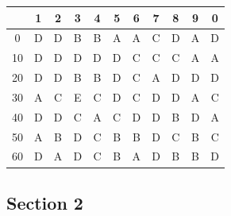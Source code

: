 \documentclass[11pt,a4paper]{article}
\begin{document}
\begin{tabular}{ | c | c c c c c c c c c c | }
\hline
 & 1 & 2 & 3 & 4 & 5 & 6 & 7 & 8 & 9 & 0 \\
\hline
0 & D & D & B & B & A & A & C & D & A & D \\
10 & D & D & D & D & D & C & C & C & A & A \\
20 & D & D & B & B & D & C & A & D & D & D \\
30 & A & C & E & C & D & C & D & D & A & C \\
40 & D & D & C & A & C & D & D & B & D & A \\
50 & A & B & D & C & B & B & D & C & B & C \\
60 & D & A & D & C & B & A & D & B & B & D \\
\hline
\end{tabular}
\clearpage
\subsection*{Section 2}
\end{document}

